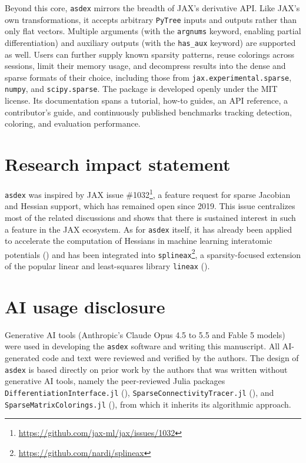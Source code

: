 \documentclass[
]{article}
\begin{document}
Beyond this core, \texttt{asdex} mirrors the breadth of JAX's derivative
API. Like JAX's own transformations, it accepts arbitrary
\texttt{PyTree} inputs and outputs rather than only flat vectors.
Multiple arguments (with the \texttt{argnums} keyword, enabling partial
differentiation) and auxiliary outputs (with the \texttt{has\_aux}
keyword) are supported as well. Users can further supply known sparsity
patterns, reuse colorings across sessions, limit their memory usage, and
decompress results into the dense and sparse formats of their choice,
including those from \texttt{jax.experimental.sparse}, \texttt{numpy},
and \texttt{scipy.sparse}. The package is developed openly under the MIT
license. Its documentation spans a tutorial, how-to guides, an API
reference, a contributor's guide, and continuously published benchmarks
tracking detection, coloring, and evaluation performance.

\section{Research impact statement}\label{research-impact-statement}

\texttt{asdex} was inspired by JAX issue \#1032\footnote{\url{https://github.com/jax-ml/jax/issues/1032}},
a feature request for sparse Jacobian and Hessian support, which has
remained open since 2019. This issue centralizes most of the related
discussions and shows that there is sustained interest in such a feature
in the JAX ecosystem. As for \texttt{asdex} itself, it has already been
applied to accelerate the computation of Hessians in machine learning
interatomic potentials () and has been integrated into \texttt{splineax}\footnote{\url{https://github.com/nardi/splineax}},
a sparsity-focused extension of the popular linear and least-squares
library \texttt{lineax} ().

\section{AI usage disclosure}\label{ai-usage-disclosure}

Generative AI tools (Anthropic's Claude Opus 4.5 to 5.5 and Fable
5 models) were used in developing the \texttt{asdex} software and
writing this manuscript. All AI-generated code and text were
reviewed and verified by the authors. The design of \texttt{asdex} is
based directly on prior work by the authors that was written without
generative AI tools, namely the peer-reviewed Julia packages
\texttt{DifferentiationInterface.jl}
(),
\texttt{SparseConnectivityTracer.jl}
(), and
\texttt{SparseMatrixColorings.jl}
(), from which it inherits its algorithmic approach.
\end{document}
